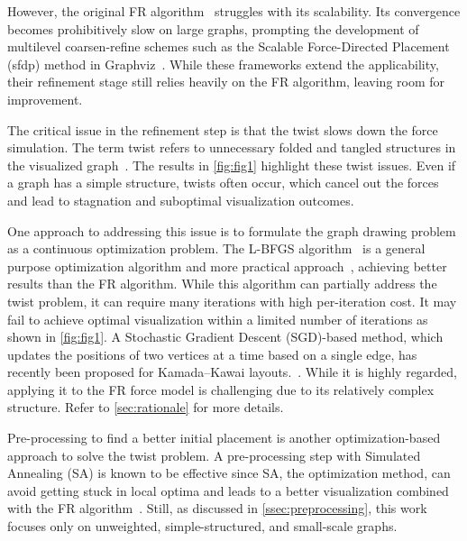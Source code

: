 \documentclass[11pt]{article}
\begin{document}
However, the original FR algorithm~\citep{fruchtermanGraphDrawingForcedirected1991} struggles with its scalability. Its convergence becomes prohibitively slow on large graphs, prompting the development of multilevel coarsen-refine schemes such as the Scalable Force-Directed Placement (\textsf{sfdp}) method in Graphviz~\citep{Hu2006EfficientHF,ellsonGraphvizOpenSource2002}. While these frameworks extend the applicability, their refinement stage still relies heavily on the FR algorithm, leaving room for improvement.

The critical issue in the refinement step is that the twist slows down the force simulation. The term twist refers to unnecessary folded and tangled structures in the visualized graph~\cite{veldhuizenDynamicMultilevelGraph2007,cheongSnapshotVisualizationComplex2018}. The results in \cref{fig:fig1} highlight these twist issues. Even if a graph has a simple structure, twists often occur, which cancel out the forces and lead to stagnation and suboptimal visualization outcomes.

One approach to addressing this issue is to formulate the graph drawing problem as a continuous optimization problem.
The L-BFGS algorithm~\citep{liuLimitedMemoryBFGS1989} is a general purpose optimization algorithm and more practical approach~\citep{6183577}, achieving better results than the FR algorithm. While this algorithm can partially address the twist problem, it can require many iterations with high per-iteration cost. It may fail to achieve optimal visualization within a limited number of iterations as shown in \cref{fig:fig1}.
A Stochastic Gradient Descent (SGD)-based method, which updates the positions of two vertices at a time based on a single edge, has recently been proposed for Kamada--Kawai layouts.~\citep{zhengGraphDrawingStochastic2019,kamadaAlgorithmDrawingGeneral1989}. While it is highly regarded, applying it to the FR force model is challenging due to its relatively complex structure. Refer to \cref{sec:rationale} for more details.

Pre-processing to find a better initial placement is another optimization-based approach to solve the twist problem. A pre-processing step with Simulated Annealing (SA) is known to be effective since SA, the optimization method, can avoid getting stuck in local optima and leads to a better visualization combined with the FR algorithm~\cite{ghassemitoosiSimulatedAnnealingPreProcessing2016}. Still, as discussed in \cref{ssec:preprocessing}, this work focuses only on unweighted, simple-structured, and small-scale graphs.
\end{document}
